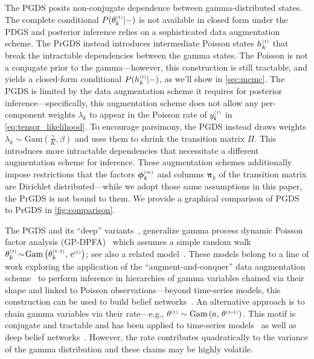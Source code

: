 \documentclass{article}
\begin{document}
The PGDS posits non-conjugate dependence between gamma-distributed states. The complete conditional $P(\thetakt | -)$ is not available in closed form under the PDGS and posterior inference relies on a sophisticated data augmentation scheme. The PrGDS instead introduces intermediate Poisson states $\hkt$ that break the intractable dependencies between the gamma states. The Poisson is not a conjugate prior to the gamma---however, this construction is still tractable, and yields a closed-form conditional $P(\hkt | -)$, as we'll show in \cref{sec:mcmc}. The PGDS is limited by the data augmentation scheme it requires for posterior inference---specifically, this augmentation scheme does not allow any per-component weights $\lambda_k$ to appear in the Poisson rate of $\ydt$ in \cref{eq:tensor_likelihood}. To encourage parsimony, the PGDS instead draws weights $\lambda_k \sim \textrm{Gam}(\tfrac{\gamma}{K}, \beta)$ and uses them to shrink the transition matrix $\Pi$. This introduces more intractable dependencies that necessitate a different augmentation scheme for inference. These augmentation schemes additionally impose restrictions that the factors $\boldsymbol{\phi}_k^{\mathsmaller{(m)}}$ and columns $\boldsymbol{\pi}_k$ of the transition matrix are Dirichlet distributed---while we adopt those same assumptions in this paper, the PrGDS is not bound to them.  We provide a graphical comparison of PGDS to PrGDS in \cref{fig:comparison}.~

The PGDS and its ``deep'' variants~\cite{gong2017deep,guo2018deep}, generalize gamma process dynamic Poisson factor analysis (GP-DPFA)~\citep{acharya2015nonparametric} which assumes a simple random walk $\thetakt \tsim \Gam{\theta^{\mathsmaller{(t \tm 1)}}_k,\, c^{\mathsmaller{(t)}}}$; see also a related model~\cite{yang2018dependent}. These models belong to a line of work exploring the application of the ``augment-and-conquer'' data augmentation scheme~\cite{zhou2012augment-and-conquer} to perform inference in hierarchies of gamma variables chained via their shape and linked to Poisson observations---beyond time-series models, this construction can be used to build belief networks~\cite{zhou2015poisson}. An alternative approach is to chain gamma variables via their rate---e.g., $\theta^{\mathsmaller{(t)}} \sim \Gam{a,\,\theta^{\mathsmaller{(t\tm 1)}}}$. This motif is conjugate and tractable and has been applied to time-series models~\cite{cemgil2007conjugate,fevotte2013non,jerfel2016dynamic} as well as deep belief networks~\cite{ranganath2015deep}. However, the rate contributes quadratically to the variance of the gamma distribution and these chains may be highly volatile.~
\end{document}
